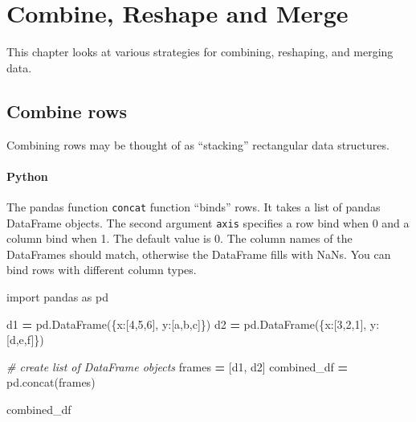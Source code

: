 \documentclass[
]{book}
\newenvironment{Shaded}{\begin{snugshade}}{\end{snugshade}}
\newcommand{\CommentTok}[1]{\textcolor[rgb]{0.56,0.35,0.01}{\textit{#1}}}
\newcommand{\DecValTok}[1]{\textcolor[rgb]{0.00,0.00,0.81}{#1}}
\newcommand{\ImportTok}[1]{#1}
\newcommand{\NormalTok}[1]{#1}
\newcommand{\OperatorTok}[1]{\textcolor[rgb]{0.81,0.36,0.00}{\textbf{#1}}}
\newcommand{\StringTok}[1]{\textcolor[rgb]{0.31,0.60,0.02}{#1}}
\begin{document}
\hypertarget{combine-reshape-and-merge}{%
\chapter{Combine, Reshape and Merge}\label{combine-reshape-and-merge}}

This chapter looks at various strategies for combining, reshaping, and merging data.

\hypertarget{combine-rows}{%
\section{Combine rows}\label{combine-rows}}

Combining rows may be thought of as ``stacking'' rectangular data structures.

\hypertarget{python-30}{%
\subsubsection*{Python}\label{python-30}}

The pandas function \texttt{concat} function ``binds'' rows. It takes a list of pandas DataFrame objects. The second argument \texttt{axis} specifies a row bind when 0 and a column bind when 1. The default value is 0. The column names of the DataFrames should match, otherwise the DataFrame fills with NaNs. You can bind rows with different column types.

\begin{Shaded}
\begin{Highlighting}[]
\ImportTok{import}\NormalTok{ pandas }\ImportTok{as}\NormalTok{ pd}

\NormalTok{d1 }\OperatorTok{=}\NormalTok{ pd.DataFrame(\{}\StringTok{\textquotesingle{}x\textquotesingle{}}\NormalTok{:[}\DecValTok{4}\NormalTok{,}\DecValTok{5}\NormalTok{,}\DecValTok{6}\NormalTok{], }\StringTok{\textquotesingle{}y\textquotesingle{}}\NormalTok{:[}\StringTok{\textquotesingle{}a\textquotesingle{}}\NormalTok{,}\StringTok{\textquotesingle{}b\textquotesingle{}}\NormalTok{,}\StringTok{\textquotesingle{}c\textquotesingle{}}\NormalTok{]\})}
\NormalTok{d2 }\OperatorTok{=}\NormalTok{ pd.DataFrame(\{}\StringTok{\textquotesingle{}x\textquotesingle{}}\NormalTok{:[}\DecValTok{3}\NormalTok{,}\DecValTok{2}\NormalTok{,}\DecValTok{1}\NormalTok{], }\StringTok{\textquotesingle{}y\textquotesingle{}}\NormalTok{:[}\StringTok{\textquotesingle{}d\textquotesingle{}}\NormalTok{,}\StringTok{\textquotesingle{}e\textquotesingle{}}\NormalTok{,}\StringTok{\textquotesingle{}f\textquotesingle{}}\NormalTok{]\})}

\CommentTok{\# create list of DataFrame objects}
\NormalTok{frames }\OperatorTok{=}\NormalTok{ [d1, d2]}
\NormalTok{combined\_df }\OperatorTok{=}\NormalTok{ pd.concat(frames)}

\NormalTok{combined\_df}
\end{Highlighting}
\end{Shaded}
\end{document}

